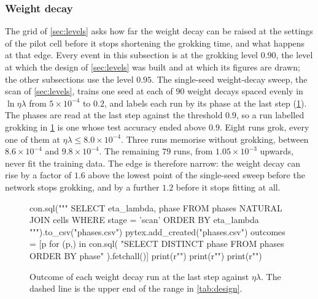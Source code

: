 \documentclass[a4paper,11pt]{article} %
\begin{document}
\subsubsection{Weight decay}\label{sec:decay}

The grid of \cref{sec:levels} asks how far the weight decay can be raised at the settings of
the pilot cell before it stops shortening the grokking time, and what happens at that edge.
Every event in this subsection is at the grokking level $0.90$, the level at which the design
of \cref{sec:levels} was built and at which its figures are drawn; the other subsections use
the level $0.95$.
The single-seed weight-decay sweep, the scan of \cref{sec:levels}, trains one seed at each of $90$ weight
decays spaced evenly in $\ln\eta\lambda$ from $5\times10^{-4}$ to $0.2$, and labels each run by its phase at the
last step (\cref{fig:phases}). The phases are read at the last step against the threshold
$0.9$, so a run labelled grokking in \cref{fig:phases} is one whose test
accuracy ended above $0.9$. Eight runs grok, every one of them at
$\eta\lambda\le8.0\times10^{-4}$. Three runs memorise without grokking, between
$8.6\times10^{-4}$ and $9.8\times10^{-4}$. The remaining $79$ runs, from
$1.05\times10^{-3}$ upwards, never fit the training data. The edge is therefore narrow: the
weight decay can rise by a factor of $1.6$ above the lowest point of the single-seed sweep before the network
stops grokking, and by a further $1.2$ before it stops fitting at all.

\begin{figure}[H]
  \centering
\begin{pycode}
con.sql("""
    SELECT eta_lambda, phase
    FROM phases NATURAL JOIN cells
    WHERE stage = 'scan'
    ORDER BY eta_lambda
""").to_csv("phases.csv")
pytex.add_created("phases.csv")
outcomes = [p for (p,) in con.sql(
    "SELECT DISTINCT phase FROM phases ORDER BY phase"
).fetchall()]
print(r"\def\phasenames{" + ",".join(outcomes) + "}")
print(r"\def\boundaryupper{" + str(con.sql("SELECT upper FROM boundary").fetchone()[0]) + "}")
print(r"")
\end{pycode}
  \caption{Outcome of each weight decay run at the last step against $\eta\lambda$.
  The dashed line is the upper end of the range in \cref{tab:design}.}
  \label{fig:phases}
\end{figure}
\end{document}
